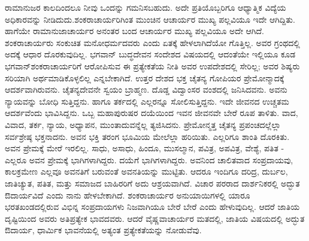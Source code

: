 ರಾಮಾನುಜರ ಕಾಲದಿಂದಲೂ ನೀವು ಒಂದನ್ನು ಗಮನಿಸಬಹುದು. ಅದೇ ಪ್ರತಿಯೊಬ್ಬರಿಗೂ ಆಧ್ಯಾತ್ಮಿಕ ವಿದ್ಯೆಯ ಅಧಿಕಾರವನ್ನು ನೀಡಿದುದು.\break ಶಂಕರಾಚಾರ್ಯರಿಗಿಂತ ಮುಂಚಿನ ಆಚಾರ್ಯರ ಮುಖ್ಯ ಪಲ್ಲವಿಯೂ ಇದೇ ಆಗಿದ್ದಿತು. ಹಾಗೆಯೇ ರಾಮಾನುಜಾಚಾರ್ಯರ ಅನಂತರ ಬಂದ ಆಚಾರ್ಯರ ಮುಖ್ಯ ಪಲ್ಲವಿಯೂ ಅದೇ ಆಗಿದೆ. ಶಂಕರಾಚಾರ್ಯರು ಸಂಕುಚಿತ ಮನೋಧರ್ಮದವರು ಎಂದು ಏತಕ್ಕೆ ಹೇಳಲಾಗಿದೆಯೋ ಗೊತ್ತಿಲ್ಲ. ಅವರ ಗ್ರಂಥದಲ್ಲಿ ಅದಕ್ಕೆ ಆಧಾರ ದೊರಕುವುದಿಲ್ಲ. ಭಗವಾನ್​ ಬುದ್ಧದೇವನ ಸಂದೇಶದ ವಿಷಯದಲ್ಲಿ ಆದಂತೆಯೇ ಇಲ್ಲಿಯೂ ಕೂಡ ಭಗವಾನ್​ ಶಂಕರಾಚಾರ್ಯರಿಗೆ ಆರೋಪಿಸುವ ಈ ಪ್ರತ್ಯೇಕತೆಯ ನೀತಿ ಅವರ ಉಪದೇಶದಲ್ಲಿ ಸೇರಿಲ್ಲ; ಅವರ ಶಿಷ್ಯರು ಸರಿಯಾಗಿ ಅರ್ಥಮಾಡಿಕೊಳ್ಳಲಿಲ್ಲ ಎನ್ನಬೇಕಾಗಿದೆ. ಉತ್ತರ ದೇಶದ ಭಕ್ತ ಚೈತನ್ಯ ಗೋಪಿಯರ ಪ್ರೇಮೋನ್ಮಾದಕ್ಕೆ ಆದರ್ಶವಾಗಿರುವನು. ಚೈತನ್ಯದೇವನೇ ಸ್ವಯಂ ಬ್ರಾಹ್ಮಣ. ದೊಡ್ಡ ವಿದ್ವಾಂಸರ ವಂಶದಲ್ಲಿ ಜನಿಸಿದವನು. ಅವನು ನ್ಯಾಯವನ್ನು ಬೋಧಿ ಸುತ್ತಿದ್ದನು. ಹಾಗೂ ತರ್ಕದಲ್ಲಿ ಎಲ್ಲರನ್ನೂ ಸೋಲಿಸುತ್ತಿದ್ದನು. ಇದೇ ಜೀವನದ ಉಚ್ಚತಮ ಆದರ್ಶವೆಂದು ಭಾವಿಸಿದ್ದನು. ಒಬ್ಬ ಮಹಾಪುರುಷರ ದಯೆಯಿಂದ ಇವನ ಜೀವನವೇ ಬೇರೆ ರೂಪ ತಾಳಿತು. ವಾದ, ವಿವಾದ, ತರ್ಕ, ನ್ಯಾಯ, ಅಧ್ಯಾಪನ, ಮುಂತಾದುವನ್ನೆಲ್ಲ ತ್ಯಜಿಸಿದನು. ಪ್ರೇಮೋನ್ಮತ್ತ ಚೈತನ್ಯ ಪ್ರಪಂಚದಲ್ಲೆಲ್ಲಾ ಸರ್ವಶ್ರೇಷ್ಠ ಭಕ್ತನಾದನು. ಅವನ ಭಕ್ತಿ ತರಂಗ ಭೂಮಿಯ ಮೇಲೆಲ್ಲಾ ಹರಿಯಿತು. ಎಲ್ಲರಿಗೂ ಶಾಂತಿ ದೊರಕಿತು. ಅವನ ಪ್ರೇಮಕ್ಕೆ ಮೇರೆ ಇರಲಿಲ್ಲ. ಸಾಧು, ಅಸಾಧು, ಹಿಂದೂ, ಮುಸಲ್ಮಾನ, ಪವಿತ್ರ, ಅಪವಿತ್ರ, ವೇಶ್ಯೆ, ಪತಿತ - ಎಲ್ಲರೂ ಅವನ ಪ್ರೇಮಕ್ಕೆ ಭಾಗಿಗಳಾಗಿದ್ದರು. ದಯೆಗೆ ಭಾಗಿಗಳಾಗಿದ್ದರು. ಅವನಿಂದ ಚಾಲಿತವಾದ ಸಂಪ್ರದಾಯವು, ಕಾಲಕ್ರಮೇಣ ಎಲ್ಲವೂ ಅವನತಿಗೆ ಬರುವಂತೆ ಅವನತಿಯನ್ನು ಮುಟ್ಟಿತು. ಆದರೂ ಇಂದಿಗೂ ದರಿದ್ರ, ದುರ್ಬಲ, ಜಾತಿಚ್ಯುತ, ಪತಿತ, ಮತ್ತು ಸಮಾಜದ ಬಾಹಿರರಿಗೆ ಅದು ಆಶ್ರಯವಾಗಿದೆ. ವಿಚಾರ ಪರರಾದ ದಾರ್ಶನಿಕರಲ್ಲಿ ಅದ್ಭುತ ಔದಾರ್ಯವಿದೆ ಎಂದು ನಾನು ಹೇಳಬೇಕಾಗಿದೆ. ಶಂಕರಾಚಾರ್ಯರ ಅನುಯಾಯಿಗಳಲ್ಲಿ ಯಾರೂ ಭರತಖಂಡದಲ್ಲಿರುವ ವಿಭಿನ್ನ ಸಂಪ್ರದಾಯಗಳು ನಿಜವಾಗಿಯೂ ಬೇರೆ ಬೇರೆ ಎಂದು ಹೇಳುವುದಿಲ್ಲ. ಆದರೆ ಜಾತಿಯ ದೃಷ್ಟಿಯಿಂದ ಅವರು ಅತಿಪ್ರತ್ಯೇಕ ಭಾವದವರು. ಆದರೆ ವೈಷ್ಣವಾಚಾರ್ಯರ ಮತದಲ್ಲಿ, ಜಾತಿಯ ವಿಷಯದಲ್ಲಿ ಅದ್ಭುತ ಔದಾರ್ಯ, ಧಾರ್ಮಿಕ ಭಾವನೆಯಲ್ಲಿ ಅತ್ಯಂತ ಪ್ರತ್ಯೇಕತೆಯನ್ನು ನೋಡುವೆವು.

